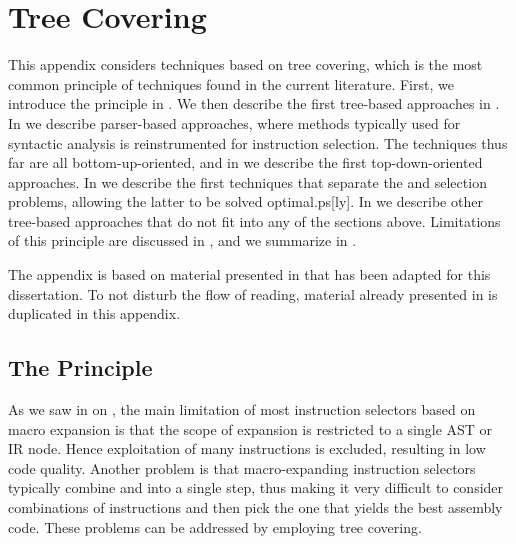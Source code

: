 %

\chapter{Tree Covering}

This appendix considers techniques based on \gls{tree covering}, which is the
most common \gls{principle} of techniques found in the current literature.
%
First, we introduce the principle in .
%
We then describe the first \gls{tree}-based approaches in
.
%
In  we describe parser-based
approaches, where methods typically used for \gls{syntactic analysis} is
reinstrumented for \gls{instruction selection}.
%
The techniques thus far are all bottom-up-oriented, and in
 we describe the first top-down-oriented
approaches.
%
In  we describe the first
techniques that separate the  and \glspl{selection
  problem}, allowing the latter to be solved \gls{optimal.ps}[ly].
%
In  we describe other
\gls{tree}-based approaches that do not fit into any of the sections above.
%
Limitations of this principle are discussed in , and
we summarize in .

The appendix is based on material presented in
\cite[Chap.]{HjortBlindell:2016:Survey} that has been adapted for
this dissertation.
%
To not disturb the flow of reading, material already presented in
 is duplicated in this appendix.


\section{The Principle}

As we saw in  on ,
the main limitation of most \glspl{instruction selector} based on \gls{macro
  expansion} is that the scope of expansion is restricted to a single \gls{AST}
or \gls{IR} \gls{node}.
%
Hence exploitation of many \glspl{instruction} is excluded, resulting in low
code quality.
%
Another problem is that \gls{macro}-expanding \glspl{instruction selector}
typically combine  and 
into a single step, thus making it very difficult to consider combinations of
\glspl{instruction} and then pick the one that yields the best \gls{assembly
  code}.
%
These problems can be addressed by employing \gls{tree covering}.

